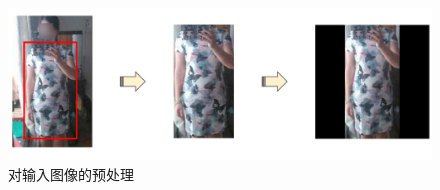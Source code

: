\begin{figure}[h]
  \centering
  \includegraphics[width=0.8\linewidth]{Img/setup.pdf}
  \caption{对输入图像的预处理}
  \label{fig:setup}
\end{figure}

